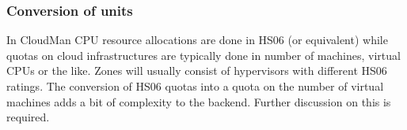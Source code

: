 \subsubsection{Conversion of units}
In CloudMan CPU resource allocations are done in HS06 (or equivalent) while quotas on cloud infrastructures are typically done in number of machines, virtual CPUs or 
the like. Zones will usually consist of hypervisors with different HS06 ratings. The conversion of HS06 quotas into a quota on the number of virtual machines adds a bit of complexity to the backend. Further discussion on this is required. 

